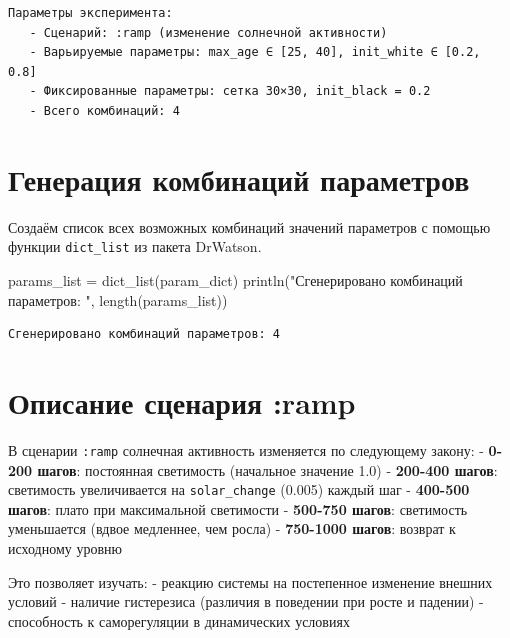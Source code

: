 \documentclass[
  12pt,
  a4paper,
  DIV=11,
  numbers=noendperiod]{scrreprt}
\newenvironment{Shaded}{\begin{snugshade}}{\end{snugshade}}
\newcommand{\FunctionTok}[1]{\textcolor[rgb]{0.28,0.35,0.67}{#1}}
\newcommand{\NormalTok}[1]{\textcolor[rgb]{0.00,0.23,0.31}{#1}}
\newcommand{\OperatorTok}[1]{\textcolor[rgb]{0.37,0.37,0.37}{#1}}
\newcommand{\StringTok}[1]{\textcolor[rgb]{0.13,0.47,0.30}{#1}}
\begin{document}
\begin{verbatim}
Параметры эксперимента:
   - Сценарий: :ramp (изменение солнечной активности)
   - Варьируемые параметры: max_age ∈ [25, 40], init_white ∈ [0.2, 0.8]
   - Фиксированные параметры: сетка 30×30, init_black = 0.2
   - Всего комбинаций: 4
\end{verbatim}

\section{Генерация комбинаций
параметров}\label{ux433ux435ux43dux435ux440ux430ux446ux438ux44f-ux43aux43eux43cux431ux438ux43dux430ux446ux438ux439-ux43fux430ux440ux430ux43cux435ux442ux440ux43eux432-2}

Создаём список всех возможных комбинаций значений параметров с помощью
функции \texttt{dict\_list} из пакета DrWatson.

\begin{Shaded}
\begin{Highlighting}[]
\NormalTok{params\_list }\OperatorTok{=} \FunctionTok{dict\_list}\NormalTok{(param\_dict)}
\FunctionTok{println}\NormalTok{(}\StringTok{"Сгенерировано комбинаций параметров: "}\NormalTok{, }\FunctionTok{length}\NormalTok{(params\_list))}
\end{Highlighting}
\end{Shaded}

\begin{verbatim}
Сгенерировано комбинаций параметров: 4
\end{verbatim}

\section{Описание сценария
:ramp}\label{ux43eux43fux438ux441ux430ux43dux438ux435-ux441ux446ux435ux43dux430ux440ux438ux44f-ramp}

В сценарии \texttt{:ramp} солнечная активность изменяется по следующему
закону: - \textbf{0-200 шагов}: постоянная светимость (начальное
значение 1.0) - \textbf{200-400 шагов}: светимость увеличивается на
\texttt{solar\_change} (0.005) каждый шаг - \textbf{400-500 шагов}:
плато при максимальной светимости - \textbf{500-750 шагов}: светимость
уменьшается (вдвое медленнее, чем росла) - \textbf{750-1000 шагов}:
возврат к исходному уровню

Это позволяет изучать: - реакцию системы на постепенное изменение
внешних условий - наличие гистерезиса (различия в поведении при росте и
падении) - способность к саморегуляции в динамических условиях
\end{document}
